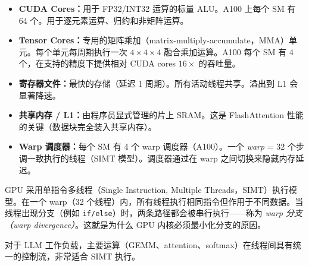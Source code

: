 \begin{keybox}[SM 的关键组件]
\begin{itemize}
  \item \textbf{CUDA Cores：}用于 FP32/INT32 运算的标量 ALU。A100 上每个 SM 有 64 个。用于逐元素运算、归约和非矩阵运算。
  \item \textbf{Tensor Cores：}专用的矩阵乘加（matrix-multiply-accumulate，MMA）单元。每个单元每周期执行一次 $4{\times}4{\times}4$ 融合乘加运算。A100 每个 SM 有 4 个，在支持的精度下提供相对 CUDA cores $16\times$ 的吞吐量。
  \item \textbf{寄存器文件：}最快的存储（延迟 1 周期）。所有活动线程共享。溢出到 L1 会显著降速。
  \item \textbf{共享内存 / L1：}由程序员显式管理的片上 SRAM。这是 FlashAttention 性能的关键（数据块完全装入共享内存）。
  \item \textbf{Warp 调度器：}每个 SM 有 4 个 warp 调度器（A100）。一个 \emph{warp} = 32 个步调一致执行的线程（SIMT 模型）。调度器通过在 warp 之间切换来隐藏内存延迟。
\end{itemize}
\end{keybox}

\begin{intuitionbox}[SIMT 执行模型]
GPU 采用单指令多线程（Single Instruction, Multiple Threads，SIMT）执行模型。在一个 warp（32 个线程）内，所有线程执行相同指令但作用于不同数据。当线程出现分支（例如 \texttt{if/else}）时，两条路径都会被串行执行——称为 \emph{warp 分支（warp divergence）}。这就是为什么 GPU 内核必须最小化分支的原因。

对于 LLM 工作负载，主要运算（GEMM、attention、softmax）在线程间具有统一的控制流，非常适合 SIMT 执行。
\end{intuitionbox}

